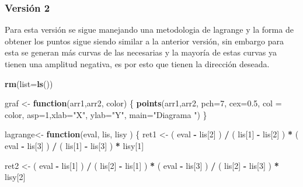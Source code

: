 \documentclass[]{article}
\newenvironment{Shaded}{\begin{snugshade}}{\end{snugshade}}
\newcommand{\KeywordTok}[1]{\textcolor[rgb]{0.13,0.29,0.53}{\textbf{#1}}}
\newcommand{\DataTypeTok}[1]{\textcolor[rgb]{0.13,0.29,0.53}{#1}}
\newcommand{\DecValTok}[1]{\textcolor[rgb]{0.00,0.00,0.81}{#1}}
\newcommand{\FloatTok}[1]{\textcolor[rgb]{0.00,0.00,0.81}{#1}}
\newcommand{\StringTok}[1]{\textcolor[rgb]{0.31,0.60,0.02}{#1}}
\newcommand{\ControlFlowTok}[1]{\textcolor[rgb]{0.13,0.29,0.53}{\textbf{#1}}}
\newcommand{\OperatorTok}[1]{\textcolor[rgb]{0.81,0.36,0.00}{\textbf{#1}}}
\newcommand{\NormalTok}[1]{#1}
\begin{document}
\subsubsection{Versión 2}\label{version-2}

Para esta versión se sigue manejando una metodologia de lagrange y la
forma de obtener los puntos sigue siendo similar a la anterior versión,
sin embargo para esta se generan más curvas de las necesarias y la
mayoría de estas curvas ya tienen una amplitud negativa, es por esto que
tienen la dirección deseada.

\begin{Shaded}
\begin{Highlighting}[]
\KeywordTok{rm}\NormalTok{(}\DataTypeTok{list=}\KeywordTok{ls}\NormalTok{())}

\NormalTok{graf <-}\StringTok{ }\ControlFlowTok{function}\NormalTok{(arr1,arr2, color)}
\NormalTok{\{}
  \KeywordTok{points}\NormalTok{(arr1,arr2, }\DataTypeTok{pch=}\DecValTok{7}\NormalTok{, }\DataTypeTok{cex=}\FloatTok{0.5}\NormalTok{, }\DataTypeTok{col =}\NormalTok{ color, }\DataTypeTok{asp=}\DecValTok{1}\NormalTok{,}\DataTypeTok{xlab=}\StringTok{"X"}\NormalTok{, }\DataTypeTok{ylab=}\StringTok{"Y"}\NormalTok{, }\DataTypeTok{main=}\StringTok{"Diagrama "}\NormalTok{)}
\NormalTok{\}}

\NormalTok{lagrange<-}\StringTok{ }\ControlFlowTok{function}\NormalTok{(eval, lis, lisy )}
\NormalTok{\{}
\NormalTok{  ret1 <-}\StringTok{ }\NormalTok{( eval }\OperatorTok{-}\StringTok{ }\NormalTok{lis[}\DecValTok{2}\NormalTok{] ) }\OperatorTok{/}\StringTok{ }\NormalTok{( lis[}\DecValTok{1}\NormalTok{] }\OperatorTok{-}\StringTok{ }\NormalTok{lis[}\DecValTok{2}\NormalTok{] ) }\OperatorTok{*}\StringTok{ }\NormalTok{( eval }\OperatorTok{-}\StringTok{ }\NormalTok{lis[}\DecValTok{3}\NormalTok{] ) }\OperatorTok{/}\StringTok{ }\NormalTok{( lis[}\DecValTok{1}\NormalTok{] }\OperatorTok{-}\StringTok{ }\NormalTok{lis[}\DecValTok{3}\NormalTok{] ) }\OperatorTok{*}\StringTok{ }\NormalTok{lisy[}\DecValTok{1}\NormalTok{]}
  
\NormalTok{  ret2 <-}\StringTok{ }\NormalTok{( eval }\OperatorTok{-}\StringTok{ }\NormalTok{lis[}\DecValTok{1}\NormalTok{] ) }\OperatorTok{/}\StringTok{ }\NormalTok{( lis[}\DecValTok{2}\NormalTok{] }\OperatorTok{-}\StringTok{ }\NormalTok{lis[}\DecValTok{1}\NormalTok{] ) }\OperatorTok{*}\StringTok{ }\NormalTok{( eval }\OperatorTok{-}\StringTok{ }\NormalTok{lis[}\DecValTok{3}\NormalTok{] ) }\OperatorTok{/}\StringTok{ }\NormalTok{( lis[}\DecValTok{2}\NormalTok{] }\OperatorTok{-}\StringTok{ }\NormalTok{lis[}\DecValTok{3}\NormalTok{] ) }\OperatorTok{*}\StringTok{ }\NormalTok{lisy[}\DecValTok{2}\NormalTok{]}
  

\end{Highlighting}
\end{Shaded}
\end{document}
